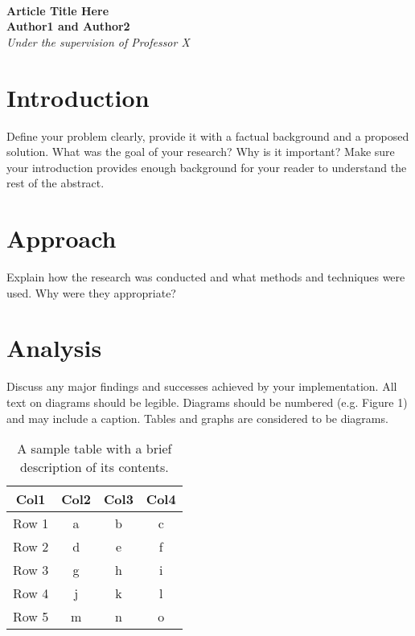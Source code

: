 \documentclass[11pt,a4paper, final, twoside]{article}
\theoremstyle{proposition}
\theoremstyle{definition}
\theoremstyle{remark}
\numberwithin{equation}{section}
\begin{document}



\begin{center}

{\Large \textbf{\\Article Title Here }}\\[5mm]
{\large \textbf{Author1 and Author2}\\[1mm]}
{\normalsize \emph{Under the supervision of Professor X}\\[1mm]}
\end{center}


\section{Introduction}\label{I1}
Define your problem clearly, provide it with a factual background and a proposed solution. What was the goal of your research? Why is it important? Make sure your introduction provides enough background for your reader to understand the rest of the abstract. \cite {01}

\section{Approach}\label{I2}
Explain how the research was conducted and what methods and techniques were used. Why were they appropriate? \cite {02}

\section{Analysis}\label{I3}
Discuss any major findings and successes achieved by your implementation. \cite {03}
\newline \newline
All text on diagrams should be legible.  Diagrams should be numbered (e.g. Figure 1) and may include a caption.  Tables and graphs are considered to be diagrams. 

 \begin{table}[h!]
 \centering
 \begin{tabular}{||c c c c||} 
 \hline
 Col1 & Col2 & Col3 & Col4 \\ %
 \hline\hline
 Row 1 & a & b & c \\ 
 \hline
 Row 2 & d & e & f \\
 \hline
 Row 3 & g & h & i \\
 \hline
 Row 4 & j & k & l \\
 \hline
 Row 5 & m & n & o \\ %
 \hline
\end{tabular}
\caption{A sample table with a brief description of its contents.}
\end{table}
\end{document}
